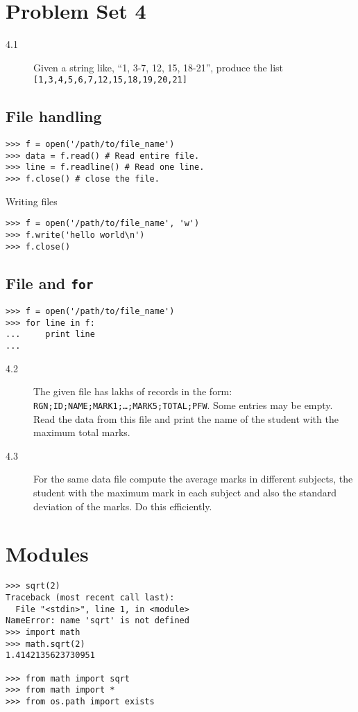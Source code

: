 \documentclass[12pt]{article}
\begin{document}
\section{Problem Set 4}
  \begin{description}
    \item[4.1] Given a string like, ``1, 3-7, 12, 15, 18-21'', produce the list\\
      \texttt{[1,3,4,5,6,7,12,15,18,19,20,21]}
\end{description}

  \subsection{File handling}
\begin{verbatim}
>>> f = open('/path/to/file_name')
>>> data = f.read() # Read entire file.
>>> line = f.readline() # Read one line.
>>> f.close() # close the file.
\end{verbatim}
Writing files
\begin{verbatim}
>>> f = open('/path/to/file_name', 'w')
>>> f.write('hello world\n')
>>> f.close()
\end{verbatim}

    \subsection{File and \texttt{for}}
\begin{verbatim}
>>> f = open('/path/to/file_name')
>>> for line in f:
...     print line
...
\end{verbatim}

  \begin{description}
    \item[4.2] The given file has lakhs of records in the form:
    \texttt{RGN;ID;NAME;MARK1;\ldots;MARK5;TOTAL;PFW}.
    Some entries may be empty.  Read the data from this file and print the
    name of the student with the maximum total marks.
  \item[4.3] For the same data file compute the average marks in different
    subjects, the student with the maximum mark in each subject and also
    the standard deviation of the marks.  Do this efficiently.
\end{description}

\section{Modules}
\begin{verbatim}
>>> sqrt(2)
Traceback (most recent call last):
  File "<stdin>", line 1, in <module>
NameError: name 'sqrt' is not defined
>>> import math        
>>> math.sqrt(2)
1.4142135623730951

>>> from math import sqrt
>>> from math import *
>>> from os.path import exists
\end{verbatim}
\end{document}
